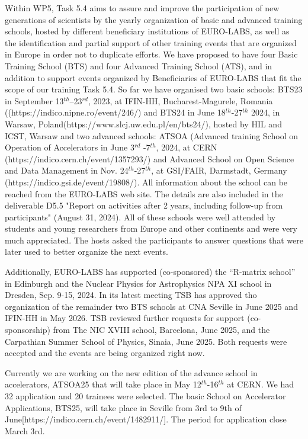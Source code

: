 Within WP5, Task 5.4 aims to assure and improve the participation of new generations of scientists by the yearly organization of basic and advanced training schools, hosted by different beneficiary institutions of EURO-LABS, as well as the identification and partial support of other training events that are organized in Europe in order not to duplicate efforts. We have proposed to have four Basic Training School (BTS) and four Advanced Training School (ATS), and in addition to support events organized by Beneficiaries of EURO-LABS that fit the scope of our training Task 5.4.
So far we have organised two basic schools: BTS23 in September 13$^{th}$–23$^{rd}$, 2023, at IFIN-HH, Bucharest-Magurele, Romania ((https://indico.nipne.ro/event/246/) and BTS24 in June 18$^{th}$-27$^{th}$ 2024, in Warsaw, Poland(https://www.slcj.uw.edu.pl/en/bts24/), hosted by HIL and ICST, Warsaw and two advanced schools: ATSOA (Advanced training School on Operation of Accelerators in June 3$^{rd}$ -7$^{th}$, 2024, at CERN (https://indico.cern.ch/event/1357293/) and Advanced School on Open Science and Data Management in Nov. 24$^{th}$-27$^{th}$, at GSI/FAIR, Darmstadt, Germany (https://indico.gsi.de/event/19808/). All information about the school can be reached from the EURO-LABS web site. The details are also included in the deliverable D5.5 "Report on activities after 2 years, including follow-up from participants" (August 31, 2024). All of these schools were well attended by students and young researchers from Europe and other continents and were very much appreciated. The hosts asked the participants to answer questions that were later used to better organize the next events. 

Additionally, EURO-LABS has supported (co-sponsored) the “R-matrix school” in Edinburgh and the Nuclear Physics for Astrophysics NPA XI school in Dresden, Sep. 9-15, 2024. In its latest meeting TSB has approved tho organization of the remainder two BTS schools at CNA Seville in June 2025 and IFIN-HH in May 2026. TSB reviewed further requests for support (co-sponsorship) from The NIC XVIII school, Barcelona, June 2025, and the Carpathian Summer School of Physics, Sinaia, June 2025. Both requests were accepted and the events are being organized right now.


Currently we are working on the new edition of the advance school in accelerators, ATSOA25 that will take place in May 12$^{th}$-16$^{th}$ at CERN. We had 32 application and 20 trainees were selected. The basic School on Accelerator Applications, BTS25, will take place in Seville from 3rd to 9th of June[https://indico.cern.ch/event/1482911/]. The period for application close March 3rd.

